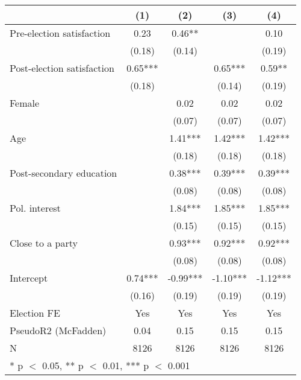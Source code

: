 \begin{tabular}[t]{lcccc}
\toprule
  & (1) & (2) & (3) & (4)\\
\midrule
Pre-election satisfaction & 0.23 & 0.46** &  & 0.10\\
 & (0.18) & (0.14) &  & (0.19)\\
Post-election satisfaction & 0.65*** &  & 0.65*** & 0.59**\\
 & (0.18) &  & (0.14) & (0.19)\\
Female &  & 0.02 & 0.02 & 0.02\\
 &  & (0.07) & (0.07) & (0.07)\\
Age &  & 1.41*** & 1.42*** & 1.42***\\
 &  & (0.18) & (0.18) & (0.18)\\
Post-secondary education &  & 0.38*** & 0.39*** & 0.39***\\
 &  & (0.08) & (0.08) & \vphantom{1} (0.08)\\
Pol. interest &  & 1.84*** & 1.85*** & 1.85***\\
 &  & (0.15) & (0.15) & (0.15)\\
Close to a party &  & 0.93*** & 0.92*** & 0.92***\\
 &  & (0.08) & (0.08) & (0.08)\\
Intercept & 0.74*** & -0.99*** & -1.10*** & -1.12***\\
 & (0.16) & (0.19) & (0.19) & (0.19)\\
Election FE & Yes & Yes & Yes & Yes\\
\midrule
PseudoR2 (McFadden) & 0.04 & 0.15 & 0.15 & 0.15\\
N & 8126 & 8126 & 8126 & 8126\\
\bottomrule
\multicolumn{5}{l}{\rule{0pt}{1em}* p $<$ 0.05, ** p $<$ 0.01, *** p $<$ 0.001}\\
\end{tabular}
